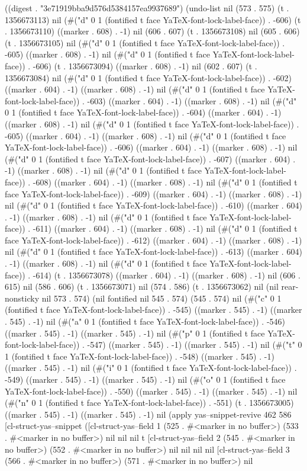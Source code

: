 
((digest . "3e71919bba9d576d5384157ea9937689") (undo-list nil (573 . 575) (t . 1356673113) nil (#("d" 0 1 (fontified t face YaTeX-font-lock-label-face)) . -606) (t . 1356673110) ((marker . 608) . -1) nil (606 . 607) (t . 1356673108) nil (605 . 606) (t . 1356673105) nil (#("d" 0 1 (fontified t face YaTeX-font-lock-label-face)) . -605) ((marker . 608) . -1) nil (#("d" 0 1 (fontified t face YaTeX-font-lock-label-face)) . -606) (t . 1356673094) ((marker . 608) . -1) nil (602 . 607) (t . 1356673084) nil (#("d" 0 1 (fontified t face YaTeX-font-lock-label-face)) . -602) ((marker . 604) . -1) ((marker . 608) . -1) nil (#("d" 0 1 (fontified t face YaTeX-font-lock-label-face)) . -603) ((marker . 604) . -1) ((marker . 608) . -1) nil (#("d" 0 1 (fontified t face YaTeX-font-lock-label-face)) . -604) ((marker . 604) . -1) ((marker . 608) . -1) nil (#("d" 0 1 (fontified t face YaTeX-font-lock-label-face)) . -605) ((marker . 604) . -1) ((marker . 608) . -1) nil (#("d" 0 1 (fontified t face YaTeX-font-lock-label-face)) . -606) ((marker . 604) . -1) ((marker . 608) . -1) nil (#("d" 0 1 (fontified t face YaTeX-font-lock-label-face)) . -607) ((marker . 604) . -1) ((marker . 608) . -1) nil (#("d" 0 1 (fontified t face YaTeX-font-lock-label-face)) . -608) ((marker . 604) . -1) ((marker . 608) . -1) nil (#("d" 0 1 (fontified t face YaTeX-font-lock-label-face)) . -609) ((marker . 604) . -1) ((marker . 608) . -1) nil (#("d" 0 1 (fontified t face YaTeX-font-lock-label-face)) . -610) ((marker . 604) . -1) ((marker . 608) . -1) nil (#("d" 0 1 (fontified t face YaTeX-font-lock-label-face)) . -611) ((marker . 604) . -1) ((marker . 608) . -1) nil (#("d" 0 1 (fontified t face YaTeX-font-lock-label-face)) . -612) ((marker . 604) . -1) ((marker . 608) . -1) nil (#("d" 0 1 (fontified t face YaTeX-font-lock-label-face)) . -613) ((marker . 604) . -1) ((marker . 608) . -1) nil (#("d" 0 1 (fontified t face YaTeX-font-lock-label-face)) . -614) (t . 1356673078) ((marker . 604) . -1) ((marker . 608) . -1) nil (606 . 615) nil (586 . 606) (t . 1356673071) nil (574 . 586) (t . 1356673062) nil (nil rear-nonsticky nil 573 . 574) (nil fontified nil 545 . 574) (545 . 574) nil (#("c" 0 1 (fontified t face YaTeX-font-lock-label-face)) . -545) ((marker . 545) . -1) ((marker . 545) . -1) nil (#("a" 0 1 (fontified t face YaTeX-font-lock-label-face)) . -546) ((marker . 545) . -1) ((marker . 545) . -1) nil (#("p" 0 1 (fontified t face YaTeX-font-lock-label-face)) . -547) ((marker . 545) . -1) ((marker . 545) . -1) nil (#("t" 0 1 (fontified t face YaTeX-font-lock-label-face)) . -548) ((marker . 545) . -1) ((marker . 545) . -1) nil (#("i" 0 1 (fontified t face YaTeX-font-lock-label-face)) . -549) ((marker . 545) . -1) ((marker . 545) . -1) nil (#("o" 0 1 (fontified t face YaTeX-font-lock-label-face)) . -550) ((marker . 545) . -1) ((marker . 545) . -1) nil (#("n" 0 1 (fontified t face YaTeX-font-lock-label-face)) . -551) (t . 1356673005) ((marker . 545) . -1) ((marker . 545) . -1) nil (apply yas--snippet-revive 462 586 [cl-struct-yas--snippet ([cl-struct-yas--field 1 (525 . #<marker in no buffer>) (533 . #<marker in no buffer>) nil nil nil t [cl-struct-yas--field 2 (545 . #<marker in no buffer>) (552 . #<marker in no buffer>) nil nil nil nil [cl-struct-yas--field 3 (566 . #<marker in no buffer>) (571 . #<marker in no buffer>) nil 
